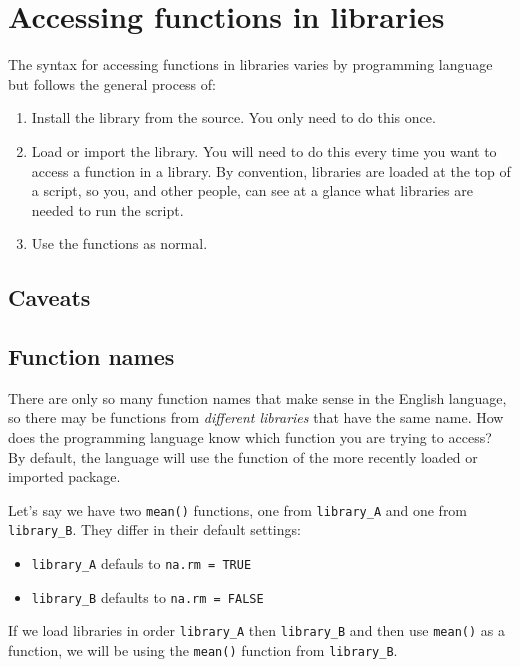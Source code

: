 \documentclass[
]{book}
\providecommand{\tightlist}{%
  \setlength{\itemsep}{0pt}\setlength{\parskip}{0pt}}
\begin{document}
\section{Accessing functions in libraries}\label{accessing-functions-in-libraries}

The syntax for accessing functions in libraries varies by programming language but follows the general process of:

\begin{enumerate}
\def\labelenumi{\arabic{enumi}.}
\tightlist
\item
  Install the library from the source. You only need to do this once.
\item
  Load or import the library. You will need to do this every time you want to access a function in a library. By convention, libraries are loaded at the top of a script, so you, and other people, can see at a glance what libraries are needed to run the script.
\item
  Use the functions as normal.
\end{enumerate}

\subsection{Caveats}\label{caveats-2}

\subsection{Function names}\label{function-names}

There are only so many function names that make sense in the English language, so there may be functions from \emph{different libraries} that have the same name. How does the programming language know which function you are trying to access? By default, the language will use the function of the more recently loaded or imported package.

Let's say we have two \texttt{mean()} functions, one from \texttt{library\_A} and one from \texttt{library\_B}. They differ in their default settings:

\begin{itemize}
\tightlist
\item
  \texttt{library\_A} defauls to \texttt{na.rm\ =\ TRUE}
\item
  \texttt{library\_B} defaults to \texttt{na.rm\ =\ FALSE}
\end{itemize}

If we load libraries in order \texttt{library\_A} then \texttt{library\_B} and then use \texttt{mean()} as a function, we will be using the \texttt{mean()} function from \texttt{library\_B}.
\end{document}
